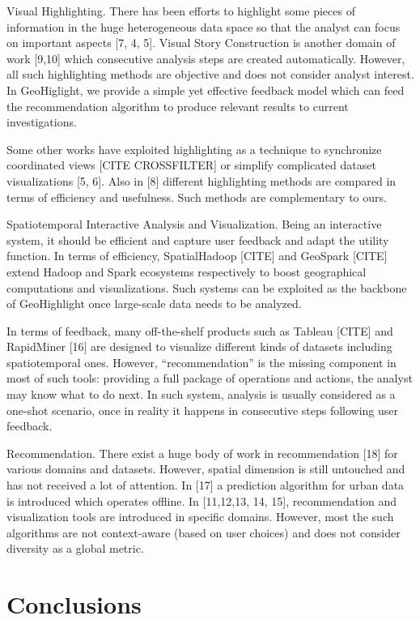 \documentclass{sig-alternate-05-2015}
\begin{document}
Visual Highlighting. There has been efforts to highlight some pieces of information in the huge heterogeneous data space so that the analyst can focus on important aspects [7, 4, 5]. Visual Story Construction is another domain of work [9,10] which consecutive analysis steps are created automatically. However, all such highlighting methods are objective and does not consider analyst interest. In GeoHiglight, we provide a simple yet effective feedback model which can feed the recommendation algorithm to produce relevant results to current investigations.

Some other works have exploited highlighting as a technique to synchronize coordinated views [CITE CROSSFILTER] or simplify complicated dataset visualizations [5, 6]. Also in [8] different highlighting methods are compared in terms of efficiency and usefulness. Such methods are complementary to ours.

Spatiotemporal Interactive Analysis and Visualization. Being an interactive system, it should be efficient and capture user feedback and adapt the utility function. In terms of efficiency, SpatialHadoop [CITE] and GeoSpark [CITE] extend Hadoop and Spark ecosystems respectively to boost geographical computations and visualizations. Such systems can be exploited as the backbone of GeoHighlight once large-scale data needs to be analyzed.

In terms of feedback, many off-the-shelf products such as Tableau [CITE] and RapidMiner [16] are designed to visualize different kinds of datasets including spatiotemporal ones. However, “recommendation” is the missing component in most of such tools: providing a full package of operations and actions, the analyst may know what to do next. In such system, analysis is usually considered as a one-shot scenario, once in reality it happens in consecutive steps following user feedback.




Recommendation. There exist a huge body of work in recommendation [18] for various domains and datasets. However, spatial dimension is still untouched and has not received a lot of attention. In [17] a prediction algorithm for urban data is introduced which operates offline. In [11,12,13, 14, 15], recommendation and visualization tools are introduced in specific domains. However, most the such algorithms are not context-aware (based on user choices) and does not consider diversity as a global metric.

\section{Conclusions}



 
\end{document}
